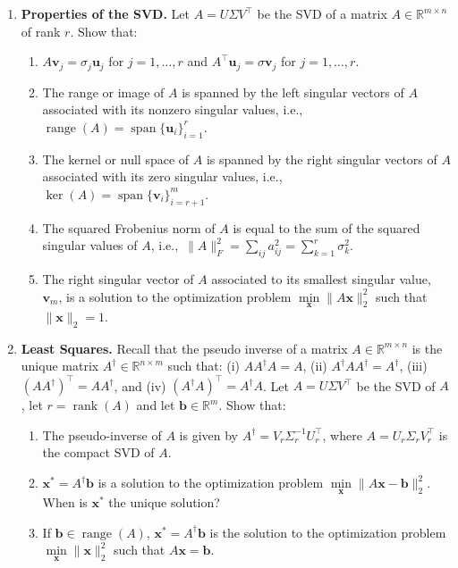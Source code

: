 \documentclass[10pt]{article}
\DeclareMathOperator*{\rank}{rank}
\DeclareMathOperator*{\range}{range}
\DeclareMathOperator*{\spn}{span}
\def\b{\boldsymbol{b}}
\def\u{\boldsymbol{u}}
\def\x{\boldsymbol{x}}
\def\v{\boldsymbol{v}}
\def\transpose{\top}
\newcommand{\ie}{{i.e.,~}}
\renewcommand{\Re}{{\mathbb{R}}}
\begin{document}
\begin{enumerate}
\item \textbf{Properties of the SVD.}
Let $ A = U \Sigma V^\transpose$ be the SVD of a matrix $A \in \Re^{m\times n}$ of rank $r$. Show that:
%
\begin{enumerate}
\item $A \v_j = \sigma_j \u_j$ for $j=1,\dots,r$ and $A^\transpose \u_j = \sigma \v_j$ for $j=1,\dots,r$.
\item The range or image of $A$ is spanned by the left singular vectors of $A$ associated with its nonzero singular values, \ie $\range(A) = \spn\{\u_i\}_{i=1}^r$.
\item The kernel or null space of $A$ is spanned by the right singular vectors of $A$ associated with its zero singular values, \ie $\ker(A) = \spn\{\v_i\}_{i=r+1}^m$.
\item The squared Frobenius norm of $A$ is equal to the sum of the squared singular values of $A$, \ie $\|A\|_F^2 = \sum_{ij} a_{ij}^2 = \sum_{k=1}^r \sigma_k^2$.
\item The right singular vector of $A$ associated to its smallest singular value, $\v_m$,  is a solution to the optimization problem $\min\limits_{\x} \|A\x\|_2^2$ such that $\|\x\|_2 = 1$.
\end{enumerate}

\item \textbf{Least Squares.}
Recall that the pseudo inverse of a matrix $A\in\Re^{m\times n}$ is the unique matrix $A^\dag \in \Re^{n\times m}$ such that: (i) $AA^\dag A = A$, (ii) $A^\dag A A^\dag = A^\dag$, (iii) $(AA^\dag )^\transpose = AA^\dag$, and (iv) $(A^\dag A)^\transpose = A^\dag A$. Let $ A = U \Sigma V^\transpose$ be the SVD of $A$, let $r = \rank(A)$ and let $\b\in\Re^m$. 
Show that:

\begin{enumerate}
\item The pseudo-inverse of $A$ is given by $A^\dag = V_r \Sigma_r^{-1} U_r^\transpose$, where $A = U_r \Sigma_r V_r ^ \transpose$ is the compact SVD of $A$. 

\item $\x^* = A^\dag \b $ is a solution to the optimization problem $\min\limits_{\x} \| A \x - \b \|_2^2$. When is $\x^*$ the unique solution?

\item If $\b \in \range (A)$, $\x^* = A^\dag \b $ is the solution to the optimization problem $\min\limits_{\x} \| \x \|_2^2$ such that $A \x = \b$. 
\end{enumerate}



\end{enumerate}
\end{document}
